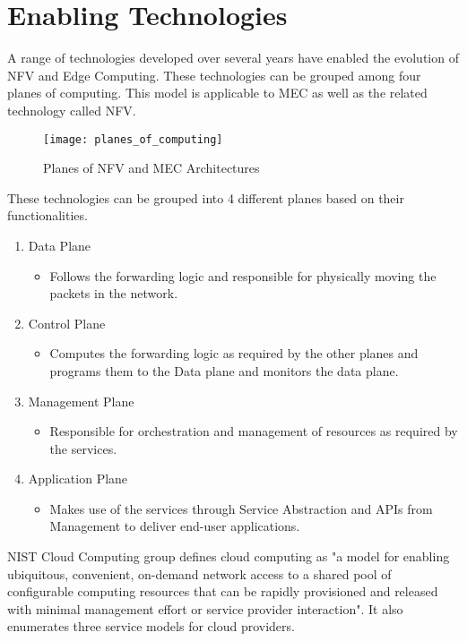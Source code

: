 \section{Enabling Technologies}

A range of technologies developed over several years have enabled the evolution of NFV and Edge Computing. These technologies can be grouped among four planes of computing. This model is applicable to MEC as well as the related technology called NFV.

\begin{figure}[h!]
	\centering
    \texttt{[image: planes\_of\_computing]}
	\label{fig:7}
	\caption{Planes of NFV and MEC Architectures}
\end{figure}

These technologies can be grouped into 4 different planes based on their functionalities.

\begin{enumerate}
    \item Data Plane
	\begin{itemize}
	    \item Follows the forwarding logic and responsible for physically moving the packets in the network.
        \end{itemize}
    \item Control Plane
	\begin{itemize}
	    \item Computes the forwarding logic as required by the other planes and programs them to the Data plane and monitors the data plane.
        \end{itemize}
    \item Management Plane
	\begin{itemize}
	    \item Responsible for orchestration and management of resources as required by the services.
	\end{itemize}
    \item Application Plane
	\begin{itemize}
	    \item Makes use of the services through Service Abstraction and APIs from Management to deliver end-user applications.
	\end{itemize}
\end{enumerate}

NIST Cloud Computing group defines cloud computing \cite{nist} as "a model for enabling ubiquitous, convenient, on-demand network access to a shared pool of configurable computing resources that can be rapidly provisioned and released with minimal management effort or service provider interaction". It also enumerates three service models for cloud providers. 

